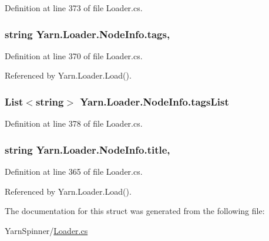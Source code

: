 Definition at line 373 of file Loader.\-cs.

\hypertarget{a00140_acd4d4915f6cc14f8b0f1f92d27da8b36}{
\subsubsection[{tags}]{\setlength{\rightskip}{0pt plus 5cm}string Yarn.\-Loader.\-Node\-Info.\-tags\hspace{0.3cm}{\ttfamily [get]}, {\ttfamily [set]}}}\label{a00140_acd4d4915f6cc14f8b0f1f92d27da8b36}


Definition at line 370 of file Loader.\-cs.



Referenced by Yarn.\-Loader.\-Load().

\hypertarget{a00140_ab5010cc4c731e0da871e6002e5fb99a1}{
\subsubsection[{tags\-List}]{\setlength{\rightskip}{0pt plus 5cm}List$<$string$>$ Yarn.\-Loader.\-Node\-Info.\-tags\-List\hspace{0.3cm}{\ttfamily [get]}}}\label{a00140_ab5010cc4c731e0da871e6002e5fb99a1}


Definition at line 378 of file Loader.\-cs.

\hypertarget{a00140_aafc45bbc86a9acb9bdbcf7877695a96c}{
\subsubsection[{title}]{\setlength{\rightskip}{0pt plus 5cm}string Yarn.\-Loader.\-Node\-Info.\-title\hspace{0.3cm}{\ttfamily [get]}, {\ttfamily [set]}}}\label{a00140_aafc45bbc86a9acb9bdbcf7877695a96c}


Definition at line 365 of file Loader.\-cs.



Referenced by Yarn.\-Loader.\-Load().



The documentation for this struct was generated from the following file\-:\begin{DoxyCompactItemize}
\item 
Yarn\-Spinner/\hyperlink{a00312}{Loader.\-cs}\end{DoxyCompactItemize}
